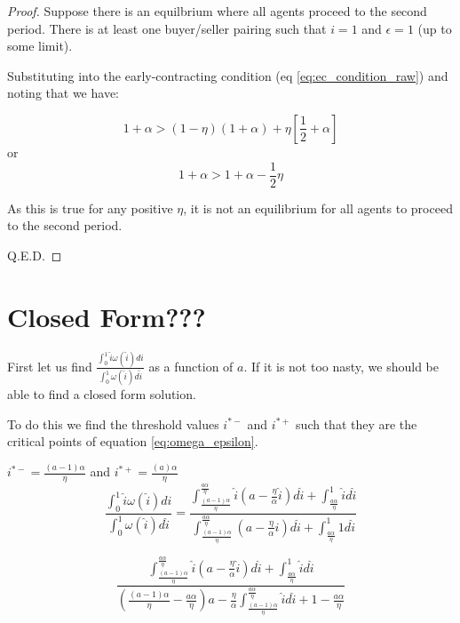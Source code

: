 \documentclass[WP]{AEA}
\begin{document}
\begin{proof}
	Suppose there is an equilbrium where all agents proceed to the second period. There is at least one buyer/seller pairing such that $i = 1$ and $\epsilon = 1$ (up to some limit).
	
	Substituting into the early-contracting condition (eq \ref{eq:ec_condition_raw}) and noting that we have:
	
	\begin{equation*}
	 1+\alpha >(1-\eta)(1+\alpha ) + \eta  \left[ \frac{1}{2} + \alpha \right] 
	\end{equation*}
or	
	\begin{equation*}
	1+\alpha > 1+\alpha   -  \frac{1}{2}\eta   
	\end{equation*}
	
	As this is true for any positive $\eta$, it is not an equilibrium for all agents to proceed to the second period.
	
	Q.E.D.
\end{proof}	

\section{Closed Form???}

First let us find  $\frac{\int_0^1 \hat{i} \omega(\hat{i}) di}{\int_0^1  \omega(\hat{i}) d\hat{i}}$ as a function of $a$.  If it is not too nasty, we should be able to find a closed form solution.
	
To do this we find the threshold values $i^{*-}$ and  $i^{*+} $ such that they are the critical points of equation \ref{eq:omega_epsilon}.

$i^{*-} = \frac{(a-1)\alpha}{\eta}$ and 
$i^{*+} = \frac{(a)\alpha}{\eta}$
\begin{equation*}
 \frac{\int_0^1 \hat{i} \omega(\hat{i}) di}{\int_0^1  \omega(\hat{i}) d\hat{i}} =  \frac{
 	\int_{\frac{(a-1)\alpha}{\eta}}^{\frac{a\alpha}{\eta}} \hat{i} (a - \frac{\eta}{\alpha}\hat{i}) d\hat{i} + 	\int_{\frac{a\alpha}{\eta}}^1 \hat{i} d\hat{i}}
 	{	\int_{\frac{(a-1)\alpha}{\eta}}^{\frac{a\alpha}{\eta}} (a - \frac{\eta}{\alpha}\hat{i}) d\hat{i} + 	\int_{\frac{a\alpha}{\eta}}^1 1d\hat{i}} 
\end{equation*}

\begin{equation*}
  \frac{
	\int_{\frac{(a-1)\alpha}{\eta}}^{\frac{a\alpha}{\eta}} \hat{i} (a - \frac{\eta}{\alpha}\hat{i}) d\hat{i} + 	\int_{\frac{a\alpha}{\eta}}^1 \hat{i} d\hat{i}}
{ ({\frac{(a-1)\alpha}{\eta}} - \frac{a\alpha}{\eta})a -	\frac{\eta}{\alpha}\int_{\frac{(a-1)\alpha}{\eta}}^{\frac{a\alpha}{\eta}}  \hat{i} d\hat{i} + 	1-\frac{a\alpha}{\eta} } 
\end{equation*}
\end{document}
